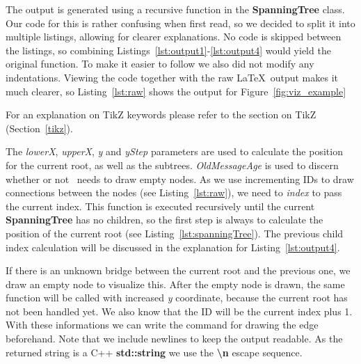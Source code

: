 The output is generated using a recursive function in the \textbf{SpanningTree} class.
Our code for this is rather confusing when first read, so we decided to split it into multiple listings, allowing for clearer explanations.
No code is skipped between the listings, so combining Listings~\ref{lst:output1}-\ref{lst:output4} would yield the original function.
To make it easier to follow we also did not modify any indentations.
Viewing the code together with the raw \LaTeX\ output makes it much clearer, so Listing~\ref{lst:raw} shows the output for Figure~\ref{fig:viz_example}

For an explanation on TikZ keywords please refer to the section on TikZ (Section~\ref{tikz}).


The \textit{lowerX}, \textit{upperX}, \textit{y} and \textit{yStep} parameters are used to calculate the position for the current root, as well as the subtrees.
\textit{OldMessageAge} is used to discern whether or not \tool\ needs to draw empty nodes.
As we use incrementing IDs to draw connections between the nodes (see Listing~\ref{lst:raw}), we need to \textit{index} to pass the current index.
This function is executed recursively until the current \textbf{SpanningTree} has no children, so the first step is always to calculate the position of the current root (see Listing~\ref{lst:spanningTree}).
The previous child index calculation will be discussed in the explanation for Listing~\ref{lst:output4}.


If there is an unknown bridge between the current root and the previous one, we draw an empty node to visualize this.
After the empty node is drawn, the same function will be called with increased \textit{y} coordinate, because the current root has not been handled yet.
We also know that the ID will be the current index plus 1.
With these informations we can write the command for drawing the edge beforehand.
Note that we include newlines to keep the output readable.
As the returned string is a C++ \textbf{std::string} we use the \textbf{\textbackslash n} escape sequence.

